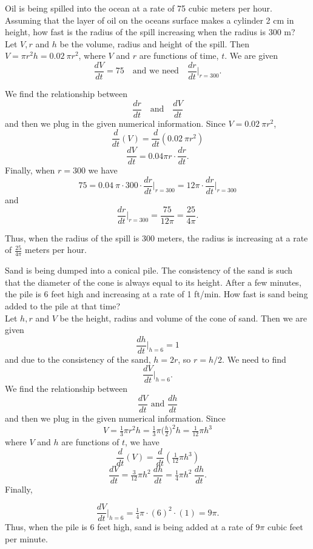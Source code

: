 \documentclass[handout]{ximera}
\begin{document}
\begin{example}[example 12]
Oil is being spilled into the ocean at a rate of 75 cubic meters per hour.  
Assuming that the layer of oil on the oceans surface makes a cylinder  2 cm in height, 
how fast is the radius of the spill increasing when the radius is 300 m?\\
Let $V, r$ and $h$ be the volume, radius and height of the spill.  Then $V = \pi r^2 h = 0.02 \ \pi r^2$,
where $V$ and $r$ are functions of time, $t$. We are given
\[\frac{dV}{dt} = 75 \quad \text{and we need} \quad \frac{dr}{dt}\bigg|_{r = 300}.\]

We find the relationship between 
\[\frac{dr}{dt} \quad \text{and}\quad \frac{dV}{dt}\]
and then we plug in the given numerical information.
Since $V =  0.02\  \pi r^2$,
\[\frac{d}{dt}(V) = \frac{d}{dt}(0.02 \ \pi r^2)\]
\[\frac{dV}{dt} = 0.04 \pi r \cdot \frac{dr}{dt}.\]
Finally, when $r = 300$ we have
\[75 = 0.04 \ \pi \cdot 300 \cdot \frac{dr}{dt}\bigg|_{r= 300} = 12 \pi \cdot \frac{dr}{dt}\bigg|_{r= 300} \]
and
\[\frac{dr}{dt}\bigg|_{r= 300} = \frac{75}{12\pi} = 
\frac{25}{4\pi}.\]





Thus, when the radius of the spill is 300 meters, the radius is increasing at a rate of $\frac{25}{4\pi}$ meters per hour.
\end{example}



\begin{example}[example 13]
Sand is being dumped into a conical pile. The consistency of the sand is such that the 
diameter of the cone is always equal to its height. After a few minutes,  the pile is 6 feet high and
increasing at a rate of 1 ft/min. How fast is sand being added to the pile at that time?\\

Let $h, r$ and $V$ be the height, radius and volume of the cone of sand. Then we are given
\[\frac{dh}{dt}\bigg|_{h = 6} = 1\]
and due to the consistency of the sand, $h = 2r$, so $r = h/2$.
We need to find 
\[\frac{dV}{dt}\bigg|_{h = 6}.\]
We find the relationship between 
\[\frac{dV}{dt} \text{ and } \frac{dh}{dt}\]
and then we plug in the given numerical information.
Since 
\[V = \tfrac13 \pi r^2 h = \tfrac13 \pi \big(\tfrac{h}{2}\big)^2 h = \tfrac{1}{12}\pi h^3\]
where $V$ and $h$ are functions of $t$, we have
\[\frac{d}{dt}(V) = \frac{d}{dt}(\tfrac{1}{12}\pi h^3)\]
\[\frac{dV}{dt} = \tfrac{3}{12}\pi h^2 \  \frac{dh}{dt} = \tfrac{1}{4}\pi h^2 \ \frac{dh}{dt}.\]
Finally,

\[\frac{dV}{dt}\bigg|_{h = 6} = \tfrac{1}{4}\pi \cdot (6)^2 \cdot(1) = 9\pi.\]
Thus, when the pile is 6 feet high, sand is being added at a rate of $9\pi$ cubic feet per minute.
\end{example}


\begin{center}
\begin{foldable}
\end{foldable}
\end{center}
\end{document}
